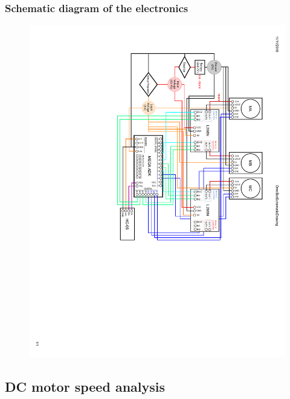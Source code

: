 \documentclass[12pt,english]{article}
\begin{document}
\subsubsection{Schematic diagram of the electronics}
\begin{figure}[htb!]
	\centering
	\includegraphics[width=17cm]{figures/Rotated}
	\label{schematic_drawing}
\end{figure}
\newpage
\subsection{DC motor speed analysis}
\end{document}
